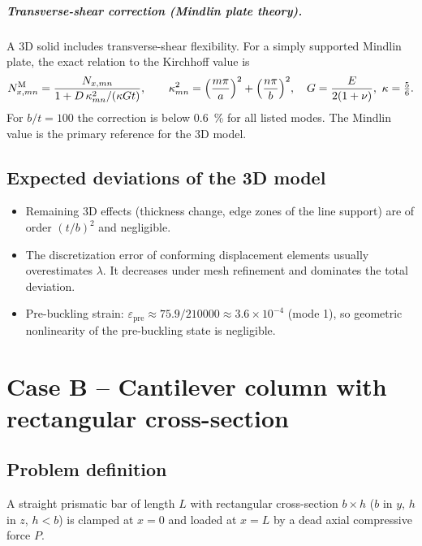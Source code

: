 \documentclass[11pt,a4paper]{report}
\begin{document}
\paragraph{Transverse-shear correction (Mindlin plate theory).}
A 3D solid includes transverse-shear flexibility. For a simply supported
Mindlin plate, the exact relation to the Kirchhoff value is
\begin{equation}
  N^{\text{M}}_{x,mn} = \frac{N_{x,mn}}{1 + D\,\kappa_{mn}^2/(\kappa G t)},
  \qquad \kappa_{mn}^2 = \Bigl(\frac{m\pi}{a}\Bigr)^2+\Bigl(\frac{n\pi}{b}\Bigr)^2,
  \quad G=\frac{E}{2(1+\nu)},\ \kappa=\tfrac56 .
\end{equation}
For $b/t=100$ the correction is below \SI{0.6}{\percent} for all listed
modes. The Mindlin value is the primary reference for the 3D model.

\section{Expected deviations of the 3D model}
\begin{itemize}
\item Remaining 3D effects (thickness change, edge zones of the line support)
  are of order $(t/b)^2$ and negligible.
\item The discretization error of conforming displacement elements usually
  overestimates $\lambda$. It decreases under mesh refinement and dominates
  the total deviation.
\item Pre-buckling strain: $\varepsilon_\text{pre}\approx 75.9/210000
  \approx 3.6\times10^{-4}$ (mode 1), so geometric nonlinearity of the
  pre-buckling state is negligible.
\end{itemize}

\chapter{Case B -- Cantilever column with rectangular cross-section}
\label{ch:column}

\section{Problem definition}

A straight prismatic bar of length $L$ with rectangular cross-section
$b\times h$ ($b$ in $y$, $h$ in $z$, $h<b$) is clamped at $x=0$ and loaded at
$x=L$ by a dead axial compressive force $P$.
\end{document}
